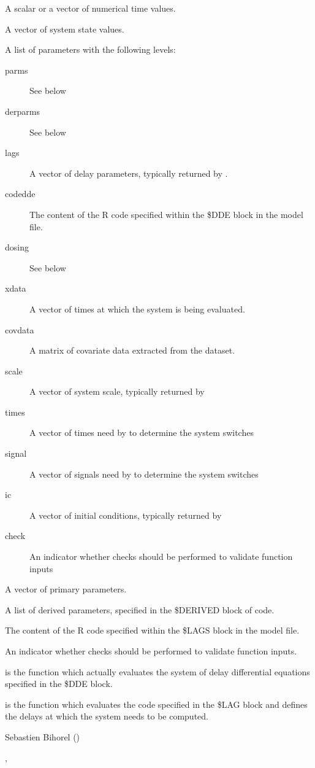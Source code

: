\begin{Arguments}
\begin{ldescription}
\item[\code{t}] A scalar or a vector of numerical time values.
\item[\code{y}] A vector of system state values.
\item[\code{dde.parms}] A list of parameters with the following levels:
\begin{description}

\item[parms] See below
\item[derparms] See below
\item[lags] A vector of delay parameters, typically returned by 
.
\item[codedde] The content of the R code specified within the \$DDE block 
in the model file.
\item[dosing] See below
\item[xdata] A vector of times at which the system is being evaluated.
\item[covdata] A matrix of covariate data extracted from the dataset.
\item[scale] A vector of system scale, typically returned by 
\item[times] A vector of times need by  to determine
the system switches
\item[signal] A vector of signals need by  to determine
the system switches
\item[ic] A vector of initial conditions, typically returned by 
\item[check] An indicator whether checks should be performed to validate 
function inputs

\end{description}


\item[\code{parms}] A vector of primary parameters.
\item[\code{derparms}] A list of derived parameters, specified in the \$DERIVED block
of code.
\item[\code{codelags}] The content of the R code specified within the \$LAGS block in
the model file.
\item[\code{check}] An indicator whether checks should be performed to validate 
function inputs.
\end{ldescription}
\end{Arguments}
%
\begin{Details}\relax
{} is the function which actually evaluates the system of delay
differential equations specified in the \$DDE block.

 is the function which evaluates the code specified in the \$LAG 
block and defines the delays at which the system needs to be computed.

\end{Details}
%
\begin{Author}\relax
Sebastien Bihorel ()
\end{Author}
%
\begin{SeeAlso}\relax
{}, 
\end{SeeAlso}

